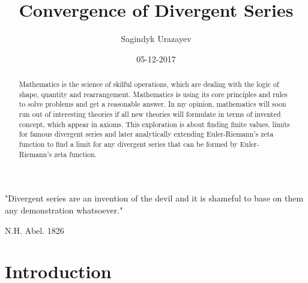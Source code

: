 \documentclass[a4paper]{article}
\title{Convergence of Divergent Series}
\date{05-12-2017}
\author{Sagindyk Urazayev}
\begin{document}
\maketitle
\tableofcontents
\listoffigures
\listoftables
\newpage

 \begin{center}
 "Divergent series are an invention of the devil and it is shameful
to base on them any demonstration whatsoever."\cite{Abel}
 \end{center}
 \begin{flushright}
   N.H. Abel. 1826
   \end{flushright}


\begin{abstract}
    Mathematics is the science of skilful operations, which are dealing with the logic of shape, quantity
and rearrangement. Mathematics is using its core principles and rules to solve problems and get a
reasonable answer. In my opinion, mathematics will soon run out of interesting theories if all new
theories will formulate in terms of invented concept, which appear in axioms. This exploration is
about finding finite values, limits for famous divergent series and later analytically extending
Euler-Riemann's zeta function to find a limit for any divergent series that can be formed by Euler-
Riemann's zeta function.
\end{abstract}

\section{Introduction}
\end{document}
